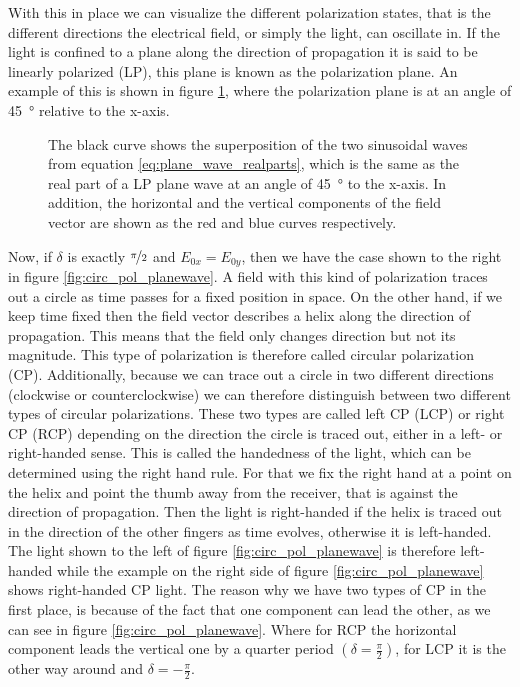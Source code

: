With this in place we can visualize the different polarization states, that is the different directions the electrical field, or simply the light, can oscillate in. If the light is confined to a plane along the direction of propagation it is said to be linearly polarized (LP), this plane is known as the polarization plane. An example of this is shown in figure \ref{fig:E_planewave}, where the polarization plane is at an angle of \SI{45}{\degree} relative to the x-axis. 

\begin{figure}[h]
    \centering
    
    \caption{The black curve shows the superposition of the two sinusoidal waves from equation \ref{eq:plane_wave_realparts}, which is the same as the real part of a LP plane wave at an angle of \SI{45}{\degree} to the x-axis. In addition, the horizontal and the vertical components of the field vector are shown as the red and blue curves respectively.}
    \label{fig:E_planewave}
\end{figure}

Now, if $\delta$ is exactly $\nicefrac{\pi}{2}$ and $E_{0x} = E_{0y}$, then we have the case shown to the right in figure \ref{fig:circ_pol_planewave}. A field with this kind of polarization traces out a circle as time passes for a fixed position in space. On the other hand, if we keep time fixed then the field vector describes a helix along the direction of propagation. This means that the field only changes direction but not its magnitude. This type of polarization is therefore called circular polarization (CP). Additionally, because we can trace out a circle in two different directions (clockwise or counterclockwise) we can therefore distinguish between two different types of circular polarizations. These two types are called left CP (LCP) or right CP (RCP) depending on the direction the circle is traced out, either in a left- or right-handed sense. This is called the handedness of the light, which can be determined using the right hand rule. For that we fix the right hand at a point on the helix and point the thumb away from the receiver, that is against the direction of propagation. Then the light is right-handed if the helix is traced out in the direction of the other fingers as time evolves, otherwise it is left-handed. The light shown to the left of figure \ref{fig:circ_pol_planewave} is therefore left-handed while the example on the right side of figure \ref{fig:circ_pol_planewave} shows right-handed CP light. The reason why we have two types of CP in the first place, is because of the fact that one component can lead the other, as we can see in figure \ref{fig:circ_pol_planewave}. Where for RCP the horizontal component leads the vertical one by a quarter period $\left(\delta = \frac{\pi}{2}\right)$, for LCP it is the other way around and $\delta = -\frac{\pi}{2}$. 


